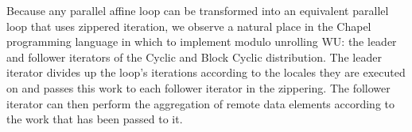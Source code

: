 Because any parallel affine loop can be transformed into an equivalent parallel loop that uses zippered iteration, we observe a natural place in the Chapel programming language in which to implement modulo unrolling WU: the leader and follower iterators of the Cyclic and Block Cyclic distribution. The leader iterator divides up the loop's iterations according to the locales they are executed on and passes this work to each follower iterator in the zippering. The follower iterator can then perform the aggregation of remote data elements according to the work that has been passed to it. 

